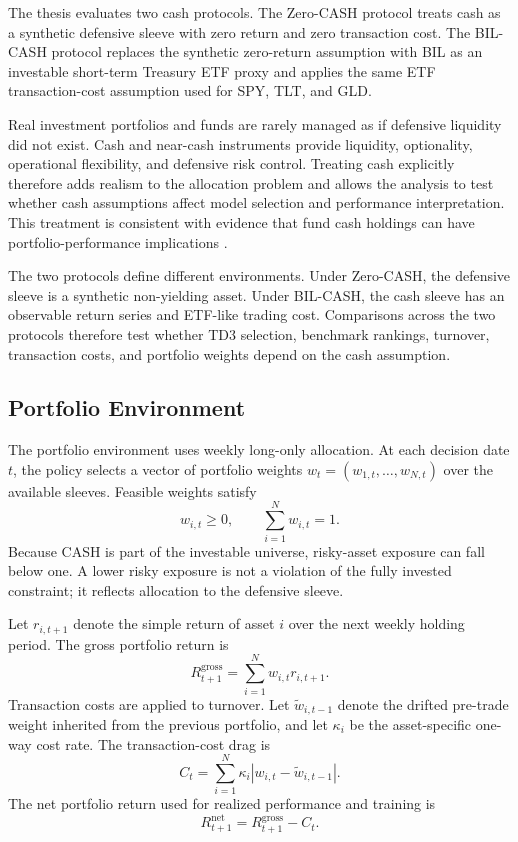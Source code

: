 \documentclass[12pt]{article}
\begin{document}
The thesis evaluates two cash protocols. The Zero-CASH protocol treats cash as a synthetic defensive sleeve with zero return and zero transaction cost. The BIL-CASH protocol replaces the synthetic zero-return assumption with BIL as an investable short-term Treasury ETF proxy and applies the same ETF transaction-cost assumption used for SPY, TLT, and GLD.

Real investment portfolios and funds are rarely managed as if defensive liquidity did not exist. Cash and near-cash instruments provide liquidity, optionality, operational flexibility, and defensive risk control. Treating cash explicitly therefore adds realism to the allocation problem and allows the analysis to test whether cash assumptions affect model selection and performance interpretation. This treatment is consistent with evidence that fund cash holdings can have portfolio-performance implications \citep{simutin2014}.

The two protocols define different environments. Under Zero-CASH, the defensive sleeve is a synthetic non-yielding asset. Under BIL-CASH, the cash sleeve has an observable return series and ETF-like trading cost. Comparisons across the two protocols therefore test whether TD3 selection, benchmark rankings, turnover, transaction costs, and portfolio weights depend on the cash assumption.

\subsection{Portfolio Environment}

The portfolio environment uses weekly long-only allocation. At each decision date $t$, the policy selects a vector of portfolio weights $w_t=(w_{1,t},\ldots,w_{N,t})$ over the available sleeves. Feasible weights satisfy
\begin{equation}
    w_{i,t} \geq 0, \qquad \sum_{i=1}^{N} w_{i,t}=1.
\end{equation}
Because CASH is part of the investable universe, risky-asset exposure can fall below one. A lower risky exposure is not a violation of the fully invested constraint; it reflects allocation to the defensive sleeve.

Let $r_{i,t+1}$ denote the simple return of asset $i$ over the next weekly holding period. The gross portfolio return is
\begin{equation}
    R^{\mathrm{gross}}_{t+1}=\sum_{i=1}^{N} w_{i,t} r_{i,t+1}.
\end{equation}
Transaction costs are applied to turnover. Let $\tilde{w}_{i,t-1}$ denote the drifted pre-trade weight inherited from the previous portfolio, and let $\kappa_i$ be the asset-specific one-way cost rate. The transaction-cost drag is
\begin{equation}
    C_t=\sum_{i=1}^{N} \kappa_i \left|w_{i,t}-\tilde{w}_{i,t-1}\right|.
\end{equation}
The net portfolio return used for realized performance and training is
\begin{equation}
    R^{\mathrm{net}}_{t+1}=R^{\mathrm{gross}}_{t+1}-C_t.
\end{equation}
\end{document}
